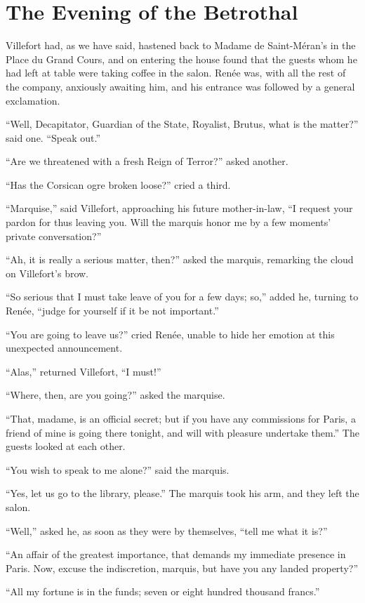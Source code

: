 \chapter{The Evening of the Betrothal}

Villefort had, as we have said, hastened back to Madame de
Saint-Méran’s in the Place du Grand Cours, and on entering the house
found that the guests whom he had left at table were taking coffee in
the salon. Renée was, with all the rest of the company, anxiously
awaiting him, and his entrance was followed by a general exclamation.

“Well, Decapitator, Guardian of the State, Royalist, Brutus, what is
the matter?” said one. “Speak out.”

“Are we threatened with a fresh Reign of Terror?” asked another.

“Has the Corsican ogre broken loose?” cried a third.

“Marquise,” said Villefort, approaching his future mother-in-law, “I
request your pardon for thus leaving you. Will the marquis honor me by
a few moments’ private conversation?”

“Ah, it is really a serious matter, then?” asked the marquis, remarking
the cloud on Villefort’s brow.

“So serious that I must take leave of you for a few days; so,” added
he, turning to Renée, “judge for yourself if it be not important.”

“You are going to leave us?” cried Renée, unable to hide her emotion at
this unexpected announcement.

“Alas,” returned Villefort, “I must!”

“Where, then, are you going?” asked the marquise.

“That, madame, is an official secret; but if you have any commissions
for Paris, a friend of mine is going there tonight, and will with
pleasure undertake them.” The guests looked at each other.

“You wish to speak to me alone?” said the marquis.

“Yes, let us go to the library, please.” The marquis took his arm, and
they left the salon.

“Well,” asked he, as soon as they were by themselves, “tell me what it
is?”

“An affair of the greatest importance, that demands my immediate
presence in Paris. Now, excuse the indiscretion, marquis, but have you
any landed property?”

“All my fortune is in the funds; seven or eight hundred thousand
francs.”

